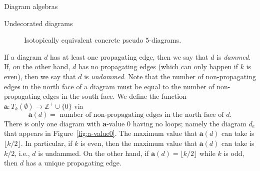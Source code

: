 \documentclass[11pt]{amsart}
\theoremstyle{definition}
\numberwithin{equation}{section}
\newcommand{\Z}{\mathbb{Z}}
\newcommand{\x}{\mathsf{x}}
\renewcommand{\a}{\mathbf{a}}
\renewcommand{\(}{\left(}
\renewcommand{\)}{\right)}
\newcommand\lp[2]{\draw[out=90,in=90] (#1,#2) to (#1 + 1,#2) [out=-90,in=-90] to (#1,#2);}
\begin{document}
\begin{section}{Diagram algebras}
\begin{subsection}{Undecorated diagrams}
\begin{figure}[!h]
\centering
\begin{subfigure}[b]{0.4\linewidth}
\centering
{}
\caption{}
\end{subfigure}
\begin{subfigure}[b]{0.4\linewidth}
\centering
{}
\caption{}
\end{subfigure}
\caption{Isotopically equivalent concrete pseudo $5$-diagrams.}\label{fig:equivalent pseudo diagrams}
\end{figure}

If a diagram $d$ has at least one propagating edge, then we say that $d$ is \emph{dammed}.  If, on the other hand, $d$ has no propagating edges (which can only happen if $k$ is even), then we say that $d$ is \emph{undammed}.  Note that the number of non-propagating edges in the north face of a diagram must be equal to the number of non-propagating edges in the south face.  We define the function $\a: T_{k}(\emptyset) \to \Z^{+}\cup \{0\}$ via
\[
\a(d)=\text{ number of non-propagating edges in the north face of } d.
\]
There is only one diagram with $\a$-value $0$ having no loops; namely the diagram $d_{e}$ that appears in Figure~\ref{fig:a-value0}.  The maximum value that $\a(d)$ can take is $\lfloor k/2 \rfloor$.  In particular, if $k$ is even, then the maximum value that $\a(d)$ can take is $k/2$, i.e., $d$ is undammed.  On the other hand, if $\a(d)=\lfloor k/2 \rfloor$ while $k$ is odd, then $d$ has a unique propagating edge.


\end{subsection}
\end{section}
\end{document}
